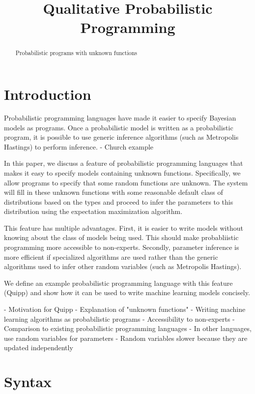 \documentclass[proceed]{article}
\title{Qualitative Probabilistic Programming}
\author {}
\begin{document}
  \maketitle

  \begin{abstract}
    Probabilistic programs with unknown functions
  \end{abstract}

  \section{Introduction}

  Probabilistic programming languages have made it easier to specify Bayesian
  models as programs.  Once a probabilistic model is written as a probabilistic
  program, it is possible to use generic inference algorithms (such as
  Metropolis Hastings) to perform inference.
    - Church example

  In this paper, we discuss a feature of probabilistic programming languages
  that makes it easy to specify models containing unknown functions.
  Specifically, we allow programs to specify that some random functions
  are unknown.  The system will fill in these unknown functions with
  some reasonable default class of distributions based on the types and
  proceed to infer the parameters to this distribution using the
  expectation maximization algorithm.

  This feature has multiple advantages.  First, it is easier to write
  models without knowing about the class of models being used.  This should
  make probabliistic programming more accessible to non-experts.  Secondly,
  parameter inference is more efficient if specialized algorithms are used
  rather than the generic algorithms used to infer other random variables
  (such as Metropolis Hastings).

  We define an example probabilistic programming language with this feature
  (Quipp) and show how it can be used to write machine learning models
  concisely.


  - Motivation for Quipp
    - Explanation of "unknown functions"
    - Writing machine learning algorithms as probabilistic programs
    - Accessibility to non-experts
    - Comparison to existing probabilistic programming languages
      - In other languages, use random variables for parameters
      - Random variables slower because they are updated independently

  \section{Syntax}
\end{document}
